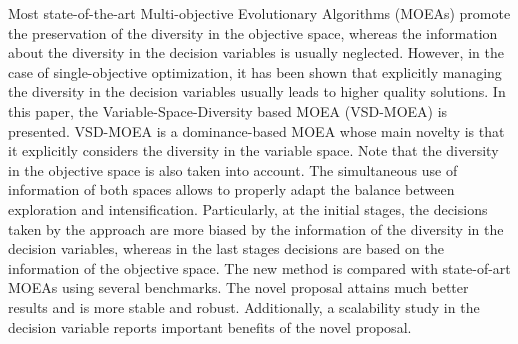Most state-of-the-art Multi-objective Evolutionary Algorithms (MOEAs) promote the preservation of the diversity 
in the objective space, whereas the information about the diversity in the decision variables is usually neglected.
%
However, in the case of single-objective optimization, it has been shown that explicitly managing the diversity in the decision
variables usually leads to higher quality solutions.
%
In this paper, the Variable-Space-Diversity based MOEA (VSD-MOEA) is presented.
%
VSD-MOEA is a dominance-based MOEA whose main novelty is that it explicitly considers the diversity in the variable space.
%
Note that the diversity in the objective space is also taken into account.
%
The simultaneous use of information of both spaces allows to properly adapt the balance between exploration and intensification.
%
Particularly, at the initial stages, the decisions taken by the approach are more biased by the information of the diversity in the decision
variables, whereas in the last stages decisions are based on the information of the objective space.
%
The new method is compared with state-of-art MOEAs using several benchmarks.
%
The novel proposal attains much better results and is more stable and robust.
%
Additionally, a scalability study in the decision variable reports important benefits of the novel proposal.
